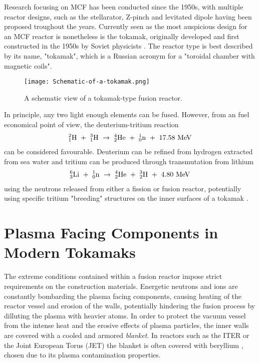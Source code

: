 Research focusing on MCF has been conducted since the 1950s, with multiple reactor designs, such as the stellarator, Z-pinch and levitated dipole having been proposed troughout the years. Currently seen as the most auspicious design for an MCF reactor is nonetheless is the tokamak, originally developed and first constructed in the 1950s by Soviet physicists \cite{tokamakorigins}. The reactor type is best described by its name, "tokamak", which is a Russian acronym for a "toroidal chamber with magnetic coils".

\begin{figure}[!ht]
\center
\texttt{[image: Schematic-of-a-tokamak.png]}
\caption{A schematic view of a tokamak-type fusion reactor.} 
\label{fig:tokamak}
\end{figure}

In principle, any two light enough elements can be fused. However, from an fuel economical point of view, the deuterium-tritium reaction 
\begin{align}
^2_1\rm{H} ~+~ ^3_1\rm{H} ~\rightarrow~ ^4_2\rm{He} ~+~ ^1_0\rm{n} ~+~ 17.58 ~\rm{MeV}
\label{Eq:D-T-reaction}
\end{align}
can be considered favourable. Deuterium can be refined from hydrogen extracted from sea water and tritium can be produced through transmutation from lithium
\begin{align}
^6_3\rm{Li} ~+~ ^1_0\rm{n} ~\rightarrow~ ^4_2\rm{He} ~+~ ^3_2\rm{H} ~+~ 4.80  ~\rm{MeV}
\end{align}
using the neutrons released from either a fission or fusion reactor, potentially using specific tritium "breeding" structures on the inner surfaces of a tokamak \cite{giancarli2012overview}.


\section{Plasma Facing Components in Modern Tokamaks}

The extreme conditions contained within a fusion reactor impose strict requirements on the construction materials. Energetic neutrons and ions are constantly bombarding the plasma facing components, causing heating of the reactor vessel and erosion of the walls, potentially hindering the fusion process by dilluting the plasma with heavier atoms. In order to protect the vacuum vessel from the intense heat and the erosive effects of plasma particles, the inner walls are covered with a cooled and armored \textit{blanket}. In reactors such as the ITER or the Joint European Torus (JET) the blanket is often covered with beryllium \cite{raffray2012overview}, chosen due to its plasma contamination properties.

